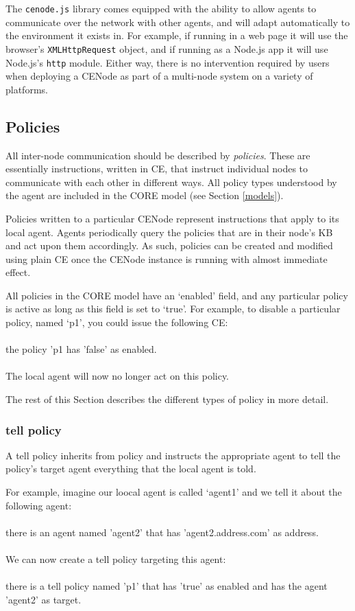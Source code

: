\documentclass{scrartcl}
\newcommand{\ce}[1]{\textsf{#1}}
\newcommand{\js}[1]{\texttt{#1}}
\begin{document}
The \js{cenode.js} library comes equipped with the ability to allow agents to communicate over the network with other agents, and will adapt automatically to the environment it exists in. For example, if running in a web page it will use the browser's \js{XMLHttpRequest} object, and if running as a Node.js app it will use Node.js's \js{http} module. Either way, there is no intervention required by users when deploying a CENode as part of a multi-node system on a variety of platforms.


\subsection{Policies}
\label{policies}
All inter-node communication should be described by \textit{policies}. These are essentially instructions, written in CE, that instruct individual nodes to communicate with each other in different ways. All policy types understood by the agent are included in the CORE model (see Section \ref{models}).

Policies written to a particular CENode represent instructions that apply to its local agent. Agents periodically query the policies that are in their node's KB and act upon them accordingly. As such, policies can be created and modified using plain CE once the CENode instance is running with almost immediate effect.

All policies in the CORE model have an `enabled' field, and any particular policy is active as long as this field is set to `true'. For example, to disable a particular policy, named `p1', you could issue the following CE:\\
\\\ce{the policy 'p1 has 'false' as enabled.}\\
\\The local agent will now no longer act on this policy.

The rest of this Section describes the different types of policy in more detail.

\subsubsection{\ce{tell policy}}
A \ce{tell policy} inherits from \ce{policy} and instructs the appropriate agent to tell the policy's target agent everything that the local agent is told.

For example, imagine our loocal agent is called `agent1' and we tell it about the following agent:\\
\\\ce{there is an agent named 'agent2' that has 'agent2.address.com' as address.}\\
\\We can now create a tell policy targeting this agent:\\
\\\ce{there is a tell policy named 'p1' that has 'true' as enabled and has the agent 'agent2' as target.}\\
\end{document}
